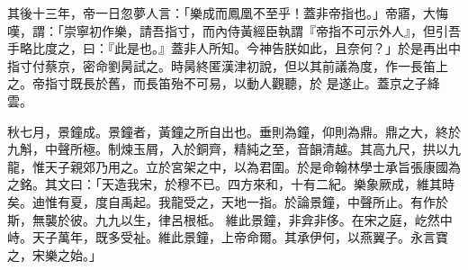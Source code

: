 \begin{pinyinscope}
 其後十三年，帝一日忽夢人言：「樂成而鳳凰不至乎！蓋非帝指也。」帝寤，大悔嘆，謂：「崇寧初作樂，請吾指寸，而內侍黃經臣執謂『帝指不可示外人』，但引吾手略比度之，曰：『此是也。』蓋非人所知。今神告朕如此，且奈何？」於是再出中指寸付蔡京，密命劉昺試之。時昺終匿漢津初說，但以其前議為度，作一長笛上之。帝指寸既長於舊，而長笛殆不可易，以動人觀聽，於
 是遂止。蓋京之子絳雲。



 秋七月，景鐘成。景鐘者，黃鐘之所自出也。垂則為鐘，仰則為鼎。鼎之大，終於九斛，中聲所極。制煉玉屑，入於銅齊，精純之至，音韻清越。其高九尺，拱以九龍，惟天子親郊乃用之。立於宮架之中，以為君圍。於是命翰林學士承旨張康國為之銘。其文曰：「天造我宋，於穆不已。四方來和，十有二紀。樂象厥成，維其時矣。迪惟有夏，度自禹起。我龍受之，天地一指。於論景鐘，中聲所止。有作於斯，無襲於彼。九九以生，律呂根柢。
 維此景鐘，非弇非侈。在宋之庭，屹然中峙。天子萬年，既多受祉。維此景鐘，上帝命爾。其承伊何，以燕翼子。永言寶之，宋樂之始。」



\end{pinyinscope}